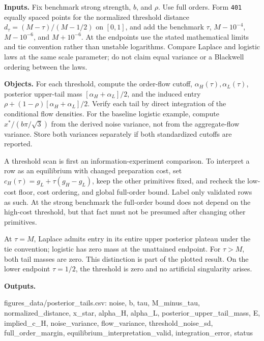 \documentclass[
  11pt,
]{article}
\newenvironment{Shaded}{}{}
\newcommand{\NormalTok}[1]{#1}
\begin{document}
\textbf{Inputs.} Fix benchmark strong strength, \(b\), and \(\rho\). Use
full orders. Form \texttt{401} equally spaced points for the normalized
threshold distance \(d_\tau=(M-\tau)/(M-1/2)\) on \([0,1]\), and add the
benchmark \(\tau\), \(M-10^{-4}\), \(M-10^{-6}\), and \(M+10^{-6}\). At
the endpoints use the stated mathematical limits and tie convention
rather than unstable logarithms. Compare Laplace and logistic laws at
the same scale parameter; do not claim equal variance or a Blackwell
ordering between the laws.

\textbf{Objects.} For each threshold, compute the order-flow cutoff,
\(\alpha_H(\tau),\alpha_L(\tau)\), posterior upper-tail mass
\([\alpha_H+\alpha_L]/2\), and the induced entry
\(\rho+(1-\rho)[\alpha_H+\alpha_L]/2\). Verify each tail by direct
integration of the conditional flow densities. For the baseline logistic
example, compute \(x^*/(b\pi/\sqrt3)\) from the derived noise variance,
not from the aggregate-flow variance. Store both variances separately if
both standardized cutoffs are reported.

A threshold scan is first an information-experiment comparison. To
interpret a row as an equilibrium with changed preparation cost, set
\(c_H(\tau)=g_L+\tau(g_H-g_L)\), keep the other primitives fixed, and
recheck the low-cost floor, cost ordering, and global full-order bound.
Label only validated rows as such. At the strong benchmark the
full-order bound does not depend on the high-cost threshold, but that
fact must not be presumed after changing other primitives.

At \(\tau=M\), Laplace admits entry in its entire upper posterior
plateau under the tie convention; logistic has zero mass at the
unattained endpoint. For \(\tau>M\), both tail masses are zero. This
distinction is part of the plotted result. On the lower endpoint
\(\tau=1/2\), the threshold is zero and no artificial singularity
arises.

\textbf{Outputs.}

\begin{Shaded}
\begin{Highlighting}[]
\NormalTok{figures\_data/posterior\_tails.csv:}
\NormalTok{noise, b, tau, M\_minus\_tau, normalized\_distance, x\_star,}
\NormalTok{alpha\_H, alpha\_L, posterior\_upper\_tail\_mass, E,}
\NormalTok{implied\_c\_H, noise\_variance, flow\_variance, threshold\_noise\_sd,}
\NormalTok{full\_order\_margin, equilibrium\_interpretation\_valid,}
\NormalTok{integration\_error, status}
\end{Highlighting}
\end{Shaded}
\end{document}
